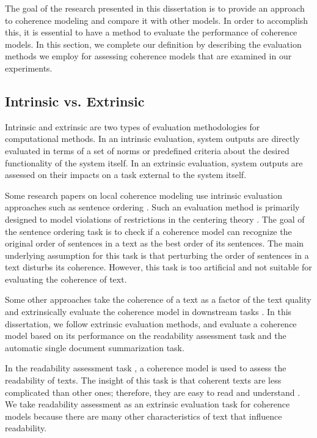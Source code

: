 The goal of the research presented in this dissertation is to provide an approach to coherence modeling and compare it with other models. 
In order to accomplish this, it is essential to have a method to evaluate the performance of coherence models. 
In this section, we complete our definition by describing the evaluation methods we employ for assessing coherence models that are examined in our experiments. 

\subsection{Intrinsic vs. Extrinsic}

Intrinsic and extrinsic are two types of evaluation methodologies for computational methods.  
In an intrinsic evaluation, system outputs are directly evaluated in terms of a set of norms or predefined criteria about the desired functionality of the system itself. 
In an extrinsic evaluation, system outputs are assessed on their impacts on a task external to the system itself. 

Some research papers on local coherence modeling use intrinsic evaluation approaches such as sentence ordering \cite{lapata03, mihalcea04b, karamanis04a, barzilay04, barzilay08}. 
Such an evaluation method is primarily designed to model violations of restrictions in the centering theory \cite{karamanis04a}. 
The goal of the sentence ordering task is to check if a coherence model can recognize the original order of sentences in a text as the best order of its sentences. 
The main underlying assumption for this task is that perturbing the order of sentences in a text disturbs its coherence.  
However, this task is too artificial and not suitable for evaluating the coherence of text. 

Some other approaches take the coherence of a text as a factor of the text quality and extrinsically evaluate the coherence model in downstream tasks \cite{miltsakaki04a,yannakoudakis12}. 
In this dissertation, we follow extrinsic evaluation methods, and evaluate a coherence model based on its performance on the readability assessment task and the automatic single document summarization task.  

In the readability assessment task  \cite{miltsakaki00,pitler08,petersen09,flor13}, a coherence model is used to assess the readability of texts. 
The insight of this task is that coherent texts are less complicated than other ones; therefore, they are easy to read and understand \cite{pitler08}. 
We take readability assessment as an extrinsic evaluation task for coherence models because there are many other characteristics of text that influence readability.  

